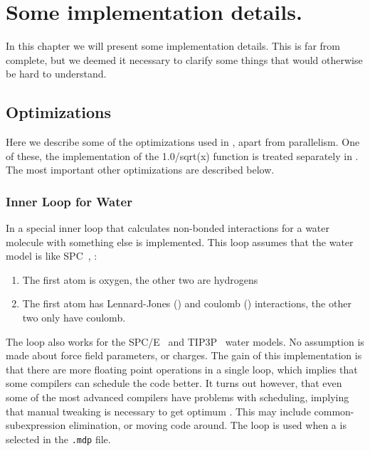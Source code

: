 \chapter{Some implementation details.}
In this chapter we will present some implementation details. This is
far from complete, but we deemed it necessary to clarify some things
that would otherwise be hard to understand.


\section{Optimizations}
Here we describe some of the optimizations used in {\gromacs}, apart
from parallelism. One of these, the implementation of the 
1.0/sqrt(x) function is treated separately in .
The most important other optimizations are described below.

\subsection{Inner Loop for Water}
In {\gromacs} a special inner loop that calculates non-bonded
interactions for a water molecule with something else is 
implemented. This loop assumes that the water model is like
SPC~\cite{Berendsen81}, {\ie}:
\begin{enumerate}
\item	The first atom is oxygen, the other two are hydrogens
\item	The first atom has Lennard-Jones () and 
	coulomb () interactions, the other
	two only have coulomb.
\end{enumerate}

The loop also works for the SPC/E~\cite{Berendsen87} and 
TIP3P~\cite{Jorgensen83} water models. No assumption is made about
force field parameters, or charges.
The gain of this implementation is that there are more floating point
operations in a single loop, which implies that some compilers
can schedule the code better. It turns out however, that even
some of the most advanced compilers have problems with scheduling, 
implying that manual tweaking is necessary to get optimum 
.
This may include common-subexpression elimination, or moving
code around. 
The loop is used when a  is selected in the 
{\tt .mdp} file.

